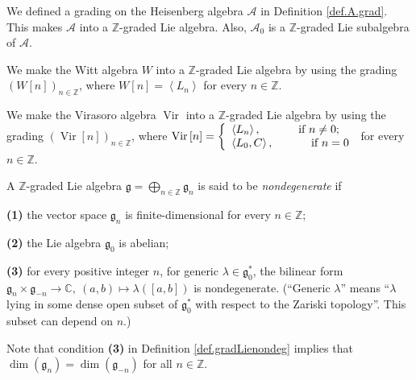 \documentclass[etingof-lie.tex]{subfiles}
\begin{document}
\begin{example}
We defined a grading on the Heisenberg algebra $\mathcal{A}$ in Definition
\ref{def.A.grad}. This makes $\mathcal{A}$ into a $\mathbb{Z}$-graded Lie
algebra. Also, $\mathcal{A}_{0}$ is a $\mathbb{Z}$-graded Lie subalgebra of
$\mathcal{A}$.
\end{example}

\begin{example}
We make the Witt algebra $W$ into a $\mathbb{Z}$-graded Lie algebra by using
the grading $\left(  W\left[  n\right]  \right)  _{n\in\mathbb{Z}}$, where
$W\left[  n\right]  =\left\langle L_{n}\right\rangle $ for every
$n\in\mathbb{Z}$.

We make the Virasoro algebra $\operatorname*{Vir}$ into a $\mathbb{Z}$-graded
Lie algebra by using the grading $\left(  \operatorname*{Vir}\left[  n\right]
\right)  _{n\in\mathbb{Z}}$, where $\operatorname*{Vir}\left[  n\right]
=\left\{
\begin{array}
[c]{l}%
\left\langle L_{n}\right\rangle ,\ \ \ \ \ \ \ \ \ \ \text{if }n\neq0;\\
\left\langle L_{0},C\right\rangle ,\ \ \ \ \ \ \ \ \ \ \text{if }n=0
\end{array}
\right.  $ for every $n\in\mathbb{Z}$.
\end{example}

\begin{definition}
\label{def.gradLienondeg}A $\mathbb{Z}$-graded Lie algebra $\mathfrak{g}%
=\bigoplus\limits_{n\in\mathbb{Z}}\mathfrak{g}_{n}$ is said to be
\textit{nondegenerate} if

\textbf{(1)} the vector space $\mathfrak{g}_{n}$ is finite-dimensional for
every $n\in\mathbb{Z}$;

\textbf{(2)} the Lie algebra $\mathfrak{g}_{0}$ is abelian;

\textbf{(3)} for every positive integer $n$, for generic $\lambda
\in\mathfrak{g}_{0}^{\ast}$, the bilinear form $\mathfrak{g}_{n}%
\times\mathfrak{g}_{-n}\rightarrow\mathbb{C},\ \left(  a,b\right)
\mapsto\lambda\left(  \left[  a,b\right]  \right)  $ is nondegenerate.
(``Generic $\lambda$'' means ``$\lambda$ lying in some dense open subset of
$\mathfrak{g}_{0}^{\ast}$ with respect to the Zariski topology''. This subset
can depend on $n$.)
\end{definition}

Note that condition \textbf{(3)} in Definition \ref{def.gradLienondeg} implies
that $\dim\left(  \mathfrak{g}_{n}\right)  =\dim\left(  \mathfrak{g}%
_{-n}\right)  $ for all $n\in\mathbb{Z}$.
\end{document}
